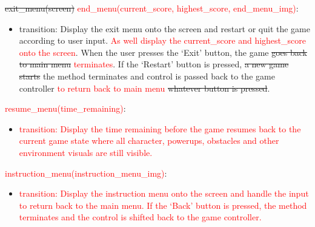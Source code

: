 \documentclass[12pt]{article}
\begin{document}
\noindent \sout{exit\_menu(screen)} \textcolor{red}{end\_menu(current\_score, highest\_score, end\_menu\_img)}:
\begin{itemize}
    \item transition: Display the exit menu onto the screen and restart or quit the game according to user input. \textcolor{red}{As well display the current\_score and highest\_score onto the screen}. When the user presses the `Exit' button, the game \sout{goes back to main menu} \textcolor{red}{terminates}. If the `Restart' button is pressed, \sout{a new game starts} the method terminates and control is passed back to the game controller \textcolor{red}{to return back to main menu} \sout{whatever button is pressed}.
\end{itemize}

\noindent  \textcolor{red}{resume\_menu(time\_remaining)}:
\begin{itemize}
    \item \textcolor{red}{transition: Display the time remaining before the game resumes back to the current game state where all character, powerups, obstacles and other environment visuals are still visible.}
\end{itemize}

\noindent  \textcolor{red}{instruction\_menu(instruction\_menu\_img)}:
\begin{itemize}
    \item \textcolor{red}{transition: Display the instruction menu onto the screen and handle the input to return back to the main menu. If the `Back' button is pressed, the method terminates and the control is shifted back to the game controller.}
\end{itemize}
\end{document}
